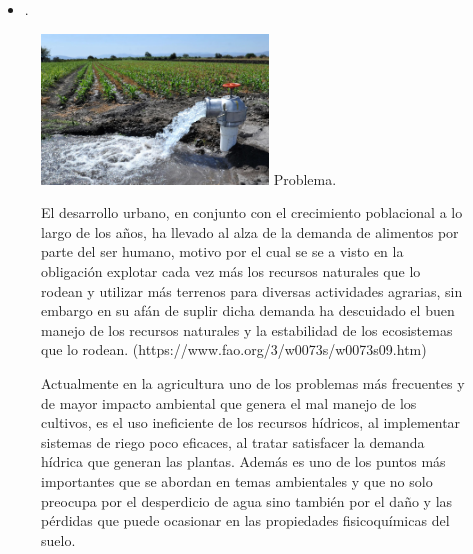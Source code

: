 \begin{frame}
	\frametitle{\secname}
	\begin{minipage}{0.6\textwidth}
		\begin{itemize}
			\item .
		\end{itemize}
	\end{minipage}
	\begin{minipage}{0.37\textwidth}
		\begin{figure}[ht!]
			\centering
			\includegraphics[height=4cm]{wasted_water}
			Problema.

			El desarrollo urbano, en conjunto con el crecimiento poblacional
			a lo largo de los años, ha llevado al alza de la demanda de
			alimentos por parte del ser humano, motivo por el cual se se a
			visto en la obligación explotar cada vez más los recursos naturales que lo rodean y utilizar más terrenos para diversas actividades agrarias, sin embargo en su afán de suplir dicha demanda ha descuidado el buen manejo de los recursos naturales y la estabilidad de los ecosistemas que lo rodean. (https://www.fao.org/3/w0073s/w0073s09.htm)

			Actualmente en la agricultura uno de los problemas más frecuentes  y de mayor impacto ambiental que genera el mal manejo de los cultivos, es el uso ineficiente de los recursos hídricos, al implementar sistemas de riego poco eficaces, al tratar satisfacer la demanda hídrica que generan las plantas. Además es uno de los puntos más importantes que se abordan en temas ambientales y que no solo preocupa por el desperdicio de agua sino también por el daño y las pérdidas que puede ocasionar en las propiedades fisicoquímicas del suelo.
		\end{figure}
	\end{minipage}
\end{frame}

